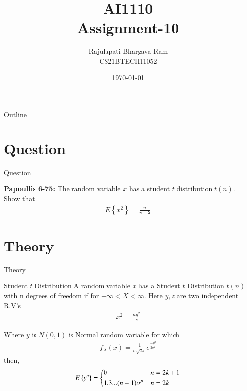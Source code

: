 \documentclass{beamer}
\title{AI1110 \\ Assignment-10}
\author{Rajulapati Bhargava Ram \\ CS21BTECH11052}
\date{\today}
\providecommand{\cbrak}[1]{\ensuremath{\left\{#1\right\}}}
\begin{document}
\begin{frame}
    \titlepage 
\end{frame}
\logo{}


\begin{frame}{Outline}
    \tableofcontents
\end{frame}



\section{Question}
\begin{frame}{Question}
    \begin{block}{\textbf{Papoullis 6-75:} } 
      The random variable $x$ has a student $t$ distribution $t(n)$. Show that 
	\begin{align}
	   E\cbrak{x^2}=\frac{n}{n-2}
	\end{align}	      
  
     \end{block}
     
\end{frame}


\section{Theory}
\begin{frame}{Theory}
   \begin{block}{Student $t$ Distribution}
      A random variable $x$ has a Student $t$ Distribution $t(n)$ with n degrees of freedom if for $-\infty<X<\infty$. Here $y,z$ are two independent R.V's
     \begin{align}
       x^2 = \frac{n y^2}{z}
     \end{align}
  \end{block}   
  
  \begin{block}{}
     Where $y$ is $N(0,1)$ is Normal random variable for which  
     \begin{align}
       f_X(x) = \frac{1}{\sigma \sqrt{2 \pi}} e^{\frac{- y^2}{2 \sigma^2}}
     \end{align}
     then,
     \begin{align}
       E\cbrak{y^n} =
       \begin{dcases}
                 0 & n = 2k+1 \\
                1.3...(n-1) \sigma^n & n = 2k  \\
       \end{dcases} \label{eq4}
     \end{align}
   \end{block}	
	
\end{frame}
\end{document}
